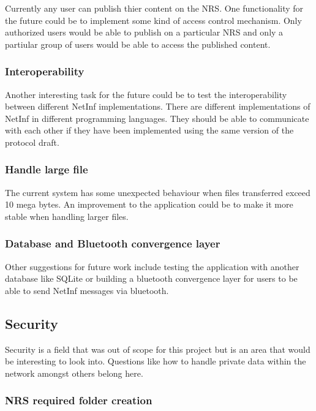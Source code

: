 Currently any user can publish thier content on the NRS. One functionality for the future could be to implement some kind of access control mechanism. Only authorized users would be able to publish on a particular NRS and only a partiular group of users would be able to access the published content. 

\subsubsection{Interoperability}

Another interesting task for the future could be to test the interoperability between different NetInf implementations. There are different implementations of NetInf in different programming languages. They should be able to communicate with each other if they have been implemented using the same version of the protocol draft. 

\subsubsection{Handle large file}

The current system has some unexpected behaviour when files transferred exceed 10 mega bytes. An improvement to the application could be to make it more stable when handling larger files.

\subsubsection{Database and Bluetooth convergence layer}

Other suggestions for future work include testing the application with another database like SQLite or building a bluetooth convergence layer for users to be able to send NetInf messages via bluetooth. 

\subsection{Security}

Security is a field that was out of scope for this project but is an area that would be interesting to look into. Questions like how to handle private data within the network amongst others belong here.

\subsubsection{NRS required folder creation}

